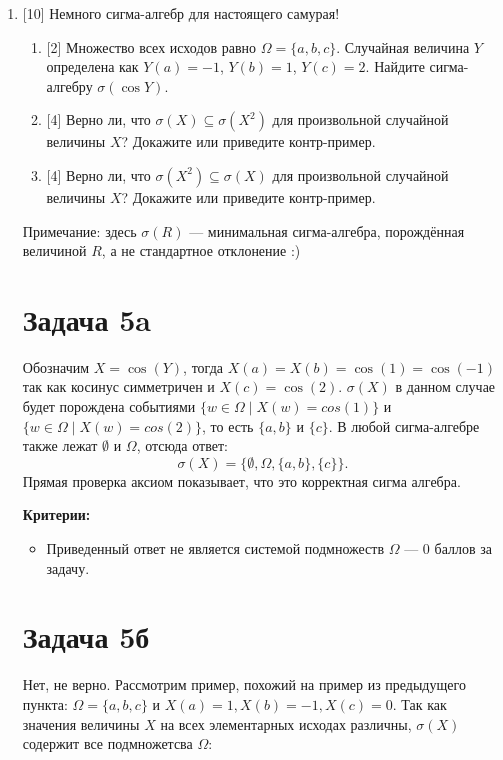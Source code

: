 \documentclass[12pt]{article}
\begin{document}
\begin{enumerate}
\item {[10]} Немного сигма-алгебр для настоящего самурая!
\begin{enumerate}
    \item {[2]} Множество всех исходов равно $\Omega = \{a, b, c\}$. 
    Случайная величина $Y$ определена как $Y(a) = -1$, $Y(b) = 1$, $Y(c) = 2$.
    Найдите сигма-алгебру $\sigma(\cos Y)$.
    \item {[4]} Верно ли, что $\sigma(X) \subseteq \sigma(X^2)$ для произвольной случайной величины $X$? Докажите или приведите контр-пример.
    \item {[4]} Верно ли, что $\sigma(X^2) \subseteq \sigma(X)$ для произвольной случайной величины $X$? Докажите или приведите контр-пример.
\end{enumerate}

Примечание: здесь $\sigma(R)$ — минимальная сигма-алгебра, порождённая величиной $R$, а не стандартное отклонение :)



\section*{Задача 5a}

Обозначим $X = \cos(Y)$, тогда $X(a) = X(b) = \cos(1) = \cos(-1)$ так как косинус симметричен и $X(c) = \cos(2)$. $\sigma(X)$ в данном случае будет порождена событиями $\{ w \in \Omega \mid X(w) = cos(1)\}$ и $\{ w \in \Omega \mid X(w) = cos(2)\}$, то есть $\{a, b\}$ и $\{c\}$. В любой сигма-алгебре также лежат $\emptyset$ и $\Omega$, отсюда ответ:
\[
\sigma(X) = \{ \emptyset, \Omega, \{a, b\}, \{c\}\}.
\]
Прямая проверка аксиом показывает, что это корректная сигма алгебра.

\vspace{0.3cm}

\textbf{Критерии:}

\begin{itemize}
    \item Приведенный ответ не является системой подмножеств $\Omega$ — 0 баллов за задачу.
\end{itemize}

\section*{Задача 5б}

Нет, не верно. Рассмотрим пример, похожий на пример из предыдущего пункта: $\Omega = \{a, b, c\}$ и $X(a) = 1, X(b) = -1, X(c) = 0$. Так как значения величины $X$ на всех элементарных исходах различны, $\sigma(X)$ содержит все подмножетсва $\Omega$:


\end{enumerate}
\end{document}
